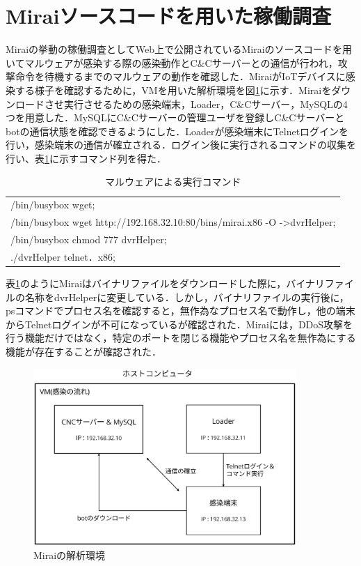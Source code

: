 \section{Miraiソースコードを用いた稼働調査}
Miraiの挙動の稼働調査としてWeb上で公開されているMiraiのソースコード\cite{code}を用いてマルウェアが感染する際の感染動作とC\&Cサーバーとの通信が行われ，攻撃命令を待機するまでのマルウェアの動作を確認した．MiraiがIoTデバイスに感染する様子を確認するために，VMを用いた解析環境を図\ref{fig:kaiseki}に示す．Miraiをダウンロードさせ実行させるための感染端末，Loader，C\&Cサーバー，MySQLの4つを用意した．MySQLにC\&Cサーバーの管理ユーザを登録しC\&Cサーバーとbotの通信状態を確認できるようにした．Loaderが感染端末にTelnetログインを行い，感染端末の通信が確立される．ログイン後に実行されるコマンドの収集を行い、表\ref{tab:malware}に示すコマンド列を得た．
\begin{table}[t]
   \caption{マルウェアによる実行コマンド}
   \label{tab:malware}
   \centering
\begin{tabular}{p{7cm}}
\hline
/bin/busybox wget;\\
/bin/busybox wget http://192.168.32.10:80/bins/mirai.x86 -O -\textgreater dvrHelper;\\
/bin/busybox chmod 777 dvrHelper;\\
./dvrHelper telnet．x86;\\
\hline
\end{tabular}
\end{table}
表\ref{tab:malware}のようにMiraiはバイナリファイルをダウンロードした際に，バイナリファイルの名称をdvrHelperに変更している．しかし，バイナリファイルの実行後に，psコマンドでプロセス名を確認すると，無作為なプロセス名で動作し，他の端末からTelnetログインが不可になっているが確認された．Miraiには，DDoS攻撃を行う機能だけではなく，特定のポートを閉じる機能やプロセス名を無作為にする機能が存在することが確認された．
 \begin{figure}[h]
 \centering
    \includegraphics[width=100mm]{figures/VM.eps}
    \caption{Miraiの解析環境}
 \label{fig:kaiseki}
 \end{figure}
 \newpage

